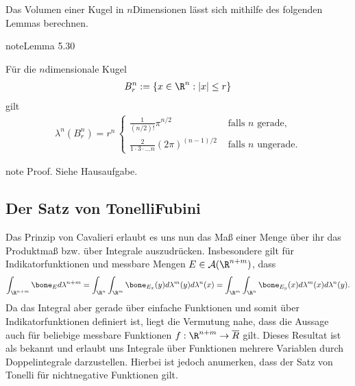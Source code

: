 \documentclass[letterpaper,10pt,german]{jupyterBook}
\begin{document}
\sphinxAtStartPar
Das Volumen einer Kugel in \(n\)\sphinxhyphen{}Dimensionen lässt sich mithilfe des folgenden Lemmas berechnen.
\label{masstheorie/integrationstechnik:lemma-20}
\begin{sphinxadmonition}{note}{Lemma 5.30}



\sphinxAtStartPar
Für die \(n\)\sphinxhyphen{}dimensionale Kugel
\begin{equation*}
\begin{split}B_r^n:=\{x\in\R^n: |x|\leq r\}\end{split}
\end{equation*}
\sphinxAtStartPar
gilt
\begin{equation*}
\begin{split}\lambda^n(B_r^n) =
r^n\,
\begin{cases}
\frac{1}{(n/2)!} \pi^{n/2}&\text{ falls }n \text{ gerade,}\\
\frac{2}{1\cdot 3\cdot\ldots n} (2\pi)^{(n-1)/2}&\text{ falls }n \text{ ungerade.}
\end{cases}\end{split}
\end{equation*}\end{sphinxadmonition}

\begin{sphinxadmonition}{note}
\sphinxAtStartPar
Proof. Siehe Hausaufgabe.
\end{sphinxadmonition}


\subsection{Der Satz von Tonelli\sphinxhyphen{}Fubini}
\label{\detokenize{masstheorie/integrationstechnik:der-satz-von-tonelli-fubini}}
\sphinxAtStartPar
Das Prinzip von Cavalieri erlaubt es uns nun das Maß einer Menge über ihr das Produktmaß bzw. über Integrale auszudrücken. Insbesondere gilt für Indikatorfunktionen und messbare Mengen \(E\in\mathcal{A}(\R^{n+m})\), dass
\begin{equation*}
\begin{split}\int_{\R^{n+m}} \bone_E d\lambda^{n+m} = \int_{\R^{n}} \int_{\R^{m}} \bone_{E_x}(y) d\lambda^m(y)d\lambda^n(x) =
\int_{\R^{m}} \int_{\R^{n}} \bone_{E_y}(x) d\lambda^m(x)d\lambda^n(y).\end{split}
\end{equation*}
\sphinxAtStartPar
Da das Integral aber gerade über einfache Funktionen und somit über Indikatorfunktionen definiert ist, liegt die Vermutung nahe, dass die Aussage auch für beliebige messbare Funktionen \(f:\R^{n+m}\to\overline{R}\) gilt. Dieses Resultat ist als  bekannt und erlaubt uns Integrale über Funktionen mehrere Variablen durch Doppelintegrale darzustellen. Hierbei ist jedoch anumerken, dass der Satz von Tonelli  für nicht\sphinxhyphen{}negative Funktionen gilt.
\end{document}
